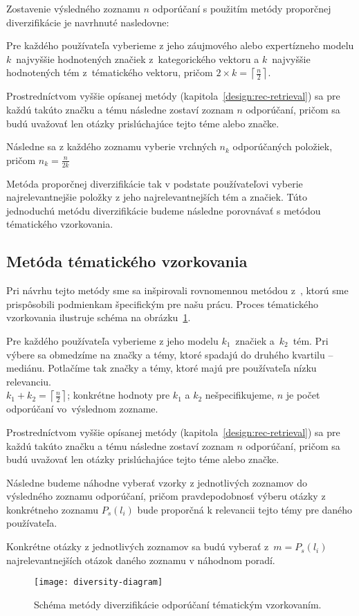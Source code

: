 Zostavenie výsledného zoznamu $n$ odporúčaní s použitím metódy proporčnej diverzifikácie je navrhnuté nasledovne:

\begin{my_enumerate}
\item{Pre každého používateľa vyberieme z jeho záujmového alebo expertízneho modelu $k$~najvyššie hodnotených značiek
    z~kategorického vektoru a $k$~najvyššie hodnotených tém z~tématického vektoru, pričom
    $2 \times k = \left\lceil\frac{n}{2}\right\rceil$.}
\item{Prostredníctvom vyššie opísanej metódy (kapitola~\ref{design:rec-retrieval}) sa pre každú takúto značku a tému
    následne zostaví zoznam $n$ odporúčaní, pričom sa budú uvažovať len otázky prislúchajúce tejto téme alebo značke.}
\item{Následne sa z každého zoznamu vyberie vrchných $n_k$ odporúčaných položiek, pričom $n_k = \frac{n}{2k}$}
\end{my_enumerate}

Metóda proporčnej diverzifikácie tak v podstate používateľovi vyberie najrelevantnejšie položky z jeho najrelevantnejších
tém a značiek. Túto jednoduchú metódu diverzifikácie budeme následne porovnávať s metódou tématického vzorkovania.


\subsection{Metóda tématického vzorkovania}
Pri návrhu tejto metódy sme sa inšpirovali rovnomennou metódou z~\cite{Szpektor2013}, ktorú sme prispôsobili
podmienkam špecifickým pre našu prácu. Proces tématického vzorkovania ilustruje schéma na obrázku~\ref{fig:tematic-sampling}.
\begin{my_enumerate}
\item{Pre každého používateľa vyberieme z jeho modelu $k_1$~značiek a~$k_2$~tém. Pri výbere sa obmedzíme na značky a témy,
    ktoré spadajú do druhého kvartilu -- mediánu. Potlačíme tak značky a témy, ktoré majú pre používateľa nízku relevanciu.\\
    $k_1 + k_2 = \left\lceil\frac{n}{2}\right\rceil$; konkrétne hodnoty pre $k_1$ a $k_2$ nešpecifikujeme, $n$ je počet
    odporúčaní vo~výslednom zozname.}
\item{
    Prostredníctvom vyššie opísanej metódy (kapitola~\ref{design:rec-retrieval}) sa pre každú takúto značku a tému
    následne zostaví zoznam $n$ odporúčaní, pričom sa budú uvažovať len otázky prislúchajúce tejto téme alebo značke.}
\item{
    Následne budeme náhodne vyberať vzorky z jednotlivých zoznamov do výsledného zoznamu odporúčaní, pričom pravdepodobnosť
    výberu otázky z konkrétneho zoznamu $P_s(l_i)$ bude proporčná k relevancii tejto témy pre daného používateľa.}
\item{
    Konkrétne otázky z jednotlivých zoznamov sa budú vyberať z~$m = P_s(l_i)$ najrelevantnejších otázok daného zoznamu
    v náhodnom poradí.}
\end{my_enumerate}

\begin{figure}[H]\begin{center}
\texttt{[image: diversity-diagram]}
\caption{Schéma metódy diverzifikácie odporúčaní tématickým vzorkovaním.\label{fig:tematic-sampling}}\end{center}
\end{figure}

